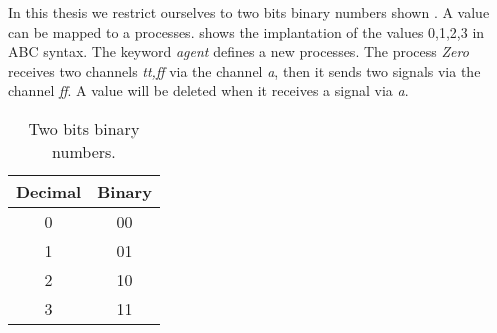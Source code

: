 In this thesis we restrict ourselves to two bits binary numbers shown . A value can be mapped to a \picalc{} processes.  shows the \picalc{} implantation of the values 0,1,2,3 in ABC syntax. The keyword \textit{agent} defines a new processes. The process \textit{Zero} receives two channels \textit{tt,ff} via the channel \textit{a}, then it sends two signals via the channel \textit{ff}. A value will be deleted when it receives a signal via \textit{a}.
\begin{table}[H]
\centering
\begin{tabular}{|c|c|}
\hline
Decimal & Binary \\ \hline
0       & 00     \\ \hline
1       & 01     \\ \hline
2       & 10     \\ \hline
3       & 11     \\ \hline
\end{tabular}%
\caption{Two bits binary numbers.}
\label{two_bit_binary_numbers}
\end{table}

